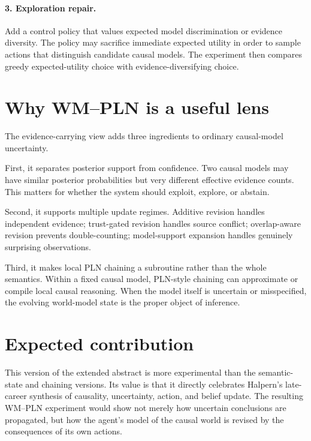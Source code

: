 \documentclass[11pt]{article}
\begin{document}
\paragraph{3. Exploration repair.}
Add a control policy that values expected model discrimination or evidence diversity. The policy may sacrifice immediate expected utility in order to sample actions that distinguish candidate causal models. The experiment then compares greedy expected-utility choice with evidence-diversifying choice.

\section{Why WM--PLN is a useful lens}

The evidence-carrying view adds three ingredients to ordinary causal-model uncertainty.

First, it separates posterior support from confidence. Two causal models may have similar posterior probabilities but very different effective evidence counts. This matters for whether the system should exploit, explore, or abstain.

Second, it supports multiple update regimes. Additive revision handles independent evidence; trust-gated revision handles source conflict; overlap-aware revision prevents double-counting; model-support expansion handles genuinely surprising observations.

Third, it makes local PLN chaining a subroutine rather than the whole semantics. Within a fixed causal model, PLN-style chaining can approximate or compile local causal reasoning. When the model itself is uncertain or misspecified, the evolving world-model state is the proper object of inference.

\section{Expected contribution}

This version of the extended abstract is more experimental than the semantic-state and chaining versions. Its value is that it directly celebrates Halpern's late-career synthesis of causality, uncertainty, action, and belief update. The resulting WM--PLN experiment would show not merely how uncertain conclusions are propagated, but how the agent's model of the causal world is revised by the consequences of its own actions.
\end{document}
